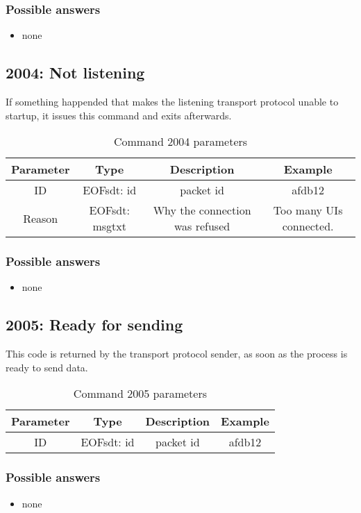 \subsubsection{Possible answers}
\begin{itemize}
\item none
\end{itemize}
\subsection{2004: Not listening}
If something happended that makes the listening transport protocol
unable to startup, it issues this command and exits afterwards.
\begin{longtable}{|c|c|c|c|}
\caption{Command 2004 parameters}\\
\hline
\textbf{Parameter} & \textbf{Type} & \textbf{Description} & \textbf{Example}\\
\hline
ID & EOFsdt: id & packet id & afdb12\\
\hline
Reason & EOFsdt: msgtxt & Why the connection was refused & Too many UIs connected.\\
\hline
\end{longtable}
\subsubsection{Possible answers}
\begin{itemize}
\item none
\end{itemize}
\subsection{2005: Ready for sending}
This code is returned by the transport protocol sender, as soon as the
process is ready to send data.
\begin{longtable}{|c|c|c|c|}
\caption{Command 2005 parameters}\\
\hline
\textbf{Parameter} & \textbf{Type} & \textbf{Description} & \textbf{Example}\\
\hline
ID & EOFsdt: id & packet id & afdb12\\
\hline
\end{longtable}
\subsubsection{Possible answers}
\begin{itemize}
\item none
\end{itemize}
